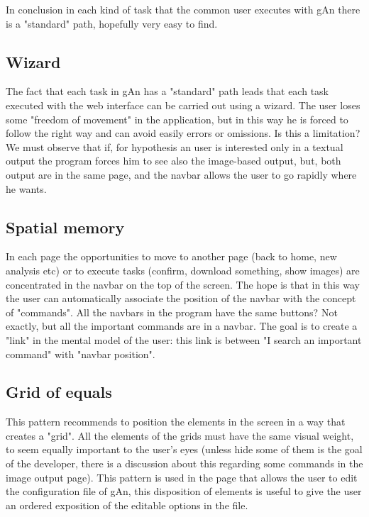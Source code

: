In conclusion in each kind of task that the common user executes with gAn there is a "standard" path, hopefully very easy to find. 

\subsection{Wizard}
The fact that each task in gAn has a "standard" path leads that each task executed with the web interface can be carried out using a wizard. The user loses some "freedom of movement" in the application, but in this way he is forced to follow the right way and can avoid easily errors or omissions.
Is this a limitation? We must observe that if, for hypothesis an user is interested only in a textual output the program forces him to see also the image-based output, but, both output are in the same page, and the navbar allows the user to go rapidly where he wants.

\subsection{Spatial memory}
In each page the opportunities to move to another page (back to home, new analysis etc) or to execute tasks (confirm, download something, show images) are concentrated in the navbar on the top of the screen. The hope is that in this way the user can automatically associate the position of the navbar with the concept of "commands". All the navbars in the program have the same buttons? Not exactly, but all the important commands are in a navbar. The goal is to create a "link" in the mental model of the user: this link is between "I search an important command" with "navbar position".

\subsection{Grid of equals}
This pattern recommends to position the elements in the screen in a way that creates a "grid". All the elements of the grids must have the same visual weight, to seem equally important to the user's eyes (unless hide some of them is the goal of the developer, there is a discussion about this regarding some commands in the image output page).
This pattern is used in the page that allows the user to edit the configuration file of gAn, this disposition of elements is useful to give the user an ordered exposition of the editable options in the file.


